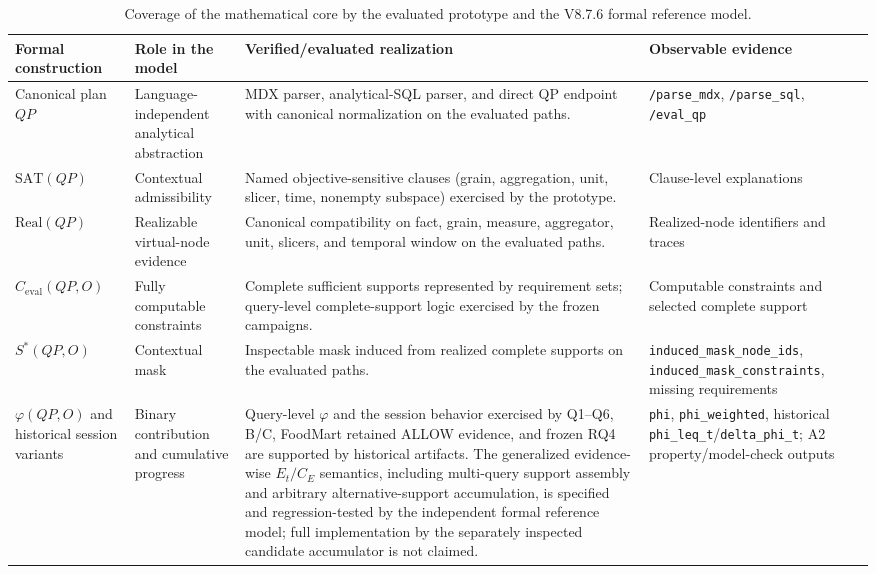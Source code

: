 \begin{table}[!t]
\centering
\caption{Coverage of the mathematical core by the evaluated prototype and the V8.7.6 formal reference model.}
\label{tab:prototype-formal-coverage}
\scriptsize
\setlength{\tabcolsep}{3pt}
\renewcommand{\arraystretch}{1.08}
\begin{tabularx}{\textwidth}{@{}p{}p{}X p{}@{}}
\toprule
Formal construction & Role in the model & Verified/evaluated realization & Observable evidence \\
\midrule
Canonical plan $QP$ & Language-independent analytical abstraction & MDX parser, analytical-SQL parser, and direct QP endpoint with canonical normalization on the evaluated paths. & \texttt{/parse\_mdx}, \texttt{/parse\_sql}, \texttt{/eval\_qp} \\
$\mathrm{SAT}(QP)$ & Contextual admissibility & Named objective-sensitive clauses (grain, aggregation, unit, slicer, time, nonempty subspace) exercised by the prototype. & Clause-level explanations \\
$\mathrm{Real}(QP)$ & Realizable virtual-node evidence & Canonical compatibility on fact, grain, measure, aggregator, unit, slicers, and temporal window on the evaluated paths. & Realized-node identifiers and traces \\
$C_{\mathrm{eval}}(QP,O)$ & Fully computable constraints & Complete sufficient supports represented by requirement sets; query-level complete-support logic exercised by the frozen campaigns. & Computable constraints and selected complete support \\
$S^*(QP,O)$ & Contextual mask & Inspectable mask induced from realized complete supports on the evaluated paths. & \texttt{induced\_mask\_node\_ids}, \texttt{induced\_mask\_constraints}, missing requirements \\
$\varphi(QP,O)$ and historical session variants & Binary contribution and cumulative progress & Query-level $\varphi$ and the session behavior exercised by Q1--Q6, B/C, FoodMart retained ALLOW evidence, and frozen RQ4 are supported by historical artifacts. The generalized evidence-wise $E_t/C_E$ semantics, including multi-query support assembly and arbitrary alternative-support accumulation, is specified and regression-tested by the independent formal reference model; full implementation by the separately inspected candidate accumulator is not claimed. & \texttt{phi}, \texttt{phi\_weighted}, historical \texttt{phi\_leq\_t}/\texttt{delta\_phi\_t}; A2 property/model-check outputs \\
\bottomrule
\end{tabularx}
\end{table}
